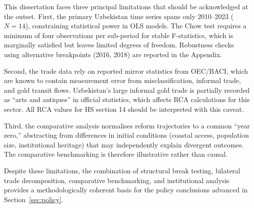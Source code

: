 This dissertation faces three principal limitations that should be acknowledged at the outset. First, the primary Uzbekistan time series spans only 2010--2023 ($N=14$), constraining statistical power in OLS models. The Chow test requires a minimum of four observations per sub-period for stable F-statistics, which is marginally satisfied but leaves limited degrees of freedom. Robustness checks using alternative breakpoints (2016, 2018) are reported in the Appendix.

Second, the trade data rely on reported mirror statistics from OEC/BACI, which are known to contain measurement error from misclassification, informal trade, and gold transit flows. Uzbekistan's large informal gold trade is partially recorded as ``arts and antiques'' in official statistics, which affects RCA calculations for this sector. All RCA values for HS section 14 should be interpreted with this caveat.

Third, the comparative analysis normalises reform trajectories to a common ``year zero,'' abstracting from differences in initial conditions (coastal access, population size, institutional heritage) that may independently explain divergent outcomes. The comparative benchmarking is therefore illustrative rather than causal.

Despite these limitations, the combination of structural break testing, bilateral trade decomposition, comparative benchmarking, and institutional analysis provides a methodologically coherent basis for the policy conclusions advanced in Section~\ref{sec:policy}.
